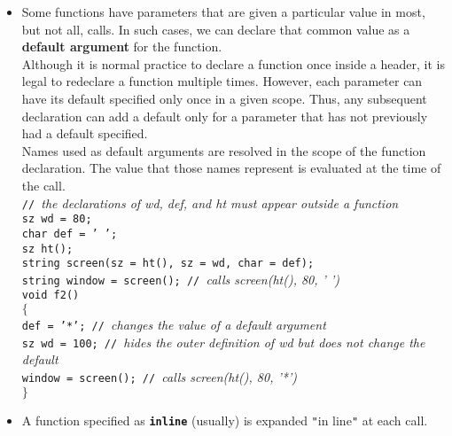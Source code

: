 \begin{itemize}
\item
Some functions have parameters that are given a particular value in most, but not all, calls. In such cases, we can declare that common value as a \textbf{default argument} for the function.\\
Although it is normal practice to declare a function once inside a header, it is legal to redeclare a function multiple times. However, each parameter can have its default specified only once in a given scope. Thus, any subsequent declaration can add a default only for a parameter that has not previously had a default specified.\\
Names used as default arguments are resolved in the scope of the function declaration. The value that those names represent is evaluated at the time of the call.\\
\hspace*{1em}\texttt{// }\textit{the declarations of wd, def, and ht must appear outside a function}\\
\hspace*{1em}\texttt{sz wd = 80;}\\
\hspace*{1em}\texttt{char def = ' ';}\\
\hspace*{1em}\texttt{sz ht();}\\
\hspace*{1em}\texttt{string screen(sz = ht(), sz = wd, char = def);}\\
\hspace*{1em}\texttt{string window = screen(); // }\textit{calls screen(ht(), 80, ' ')}\\
\hspace*{1em}\texttt{void f2()}\\
\hspace*{1em}\texttt{$\{$}\\
\hspace*{3em}\texttt{def = '*';		// }\textit{changes the value of a default argument}\\
\hspace*{3em}\texttt{sz wd = 100;	// }\textit{hides the outer definition of wd but does not change the default}\\
\hspace*{3em}\texttt{window = screen(); // }\textit{calls screen(ht(), 80, '*')}\\
\hspace*{1em}\texttt{$\}$}

\item
A function specified as \textbf{\texttt{inline}} (usually) is expanded \texttt{"}in line\texttt{"} at each call.


\end{itemize}
